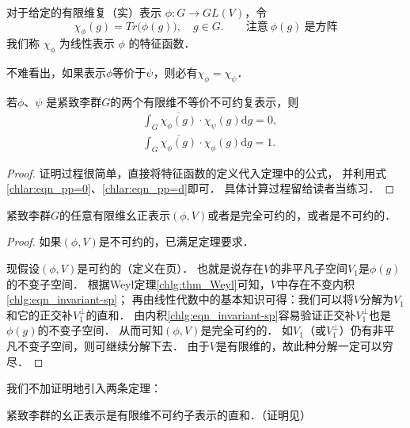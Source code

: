 \begin{definition}
	对于给定的有限维复（实）表示 $\phi: G \rightarrow {GL}(V)$，令
	\begin{equation}
		\chi_{\phi}(g)= Tr \bigl(\phi(g)\bigr), \quad g \in G.
		\qquad \text{注意}\  \phi(g) \  \text{是方阵}
	\end{equation}
	我们称 $\chi_{\phi}$ 为线性表示 $\phi$ 的{\heiti 特征函数}．
\end{definition}

不难看出，如果表示$\phi$等价于$\psi$，则必有$\chi_{\phi}=\chi_\psi$．


\begin{theorem}\label{chlar:thm_Xo}
	若$\phi$、$\psi$ 是紧致李群$G$的两个有限维不等价不可约复表示，则
	\begin{align}
		& \int_G \overline{\chi_{\phi}(g)} \cdot \chi_\psi(g) \mathrm{d} g=0, \\
		& \int_G \overline{\chi_{\phi}(g)} \cdot \chi_{\phi}(g) \mathrm{d} g=1 .
	\end{align}
\end{theorem}

\begin{proof}
	证明过程很简单，直接将特征函数的定义代入定理中的公式，
	并利用式\eqref{chlar:eqn_pp=0}、\eqref{chlar:eqn_pp=d}即可．
	具体计算过程留给读者当练习．
\end{proof}


\begin{theorem}
	紧致李群$G$的任意有限维幺正表示$(\phi,V)$或者是完全可约的，或者是不可约的．
\end{theorem}

\begin{proof}
	如果$(\phi,V)$是不可约的，已满足定理要求．
	
	现假设$(\phi,V)$是可约的（定义在\pageref{chtop:def_irreducible-representation}页）．
	也就是说存在$V$的非平凡子空间$V_1$是$\phi(g)$的不变子空间．
	根据Weyl定理\ref{chlg:thm_Weyl}可知，$V$中存在不变内积\eqref{chlg:eqn_invariant-sp}；
	再由线性代数中的基本知识可得：我们可以将$V$分解为$V_1$和它的正交补$V_1^{\perp}$的直和．
	由内积\eqref{chlg:eqn_invariant-sp}容易验证正交补$V_1^{\perp}$也是$\phi(g)$的不变子空间．
	从而可知$(\phi,V)$是完全可约的．
	如$V_1$（或$V_1^{\perp}$）仍有非平凡不变子空间，则可继续分解下去．
	由于$V$是有限维的，故此种分解一定可以穷尽．
\end{proof}

我们不加证明地引入两条定理：

\begin{theorem}\label{chlar:thm_CG-FU}
	紧致李群的幺正表示是有限维不可约子表示的直和．（证明见\parencite[p.346]{qiuws-2011}）
\end{theorem}

